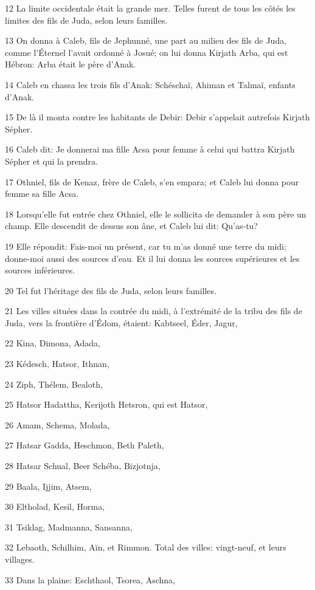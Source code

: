 \par 12 La limite occidentale était la grande mer. Telles furent de tous les côtés les limites des fils de Juda, selon leurs familles.
\par 13 On donna à Caleb, fils de Jephunné, une part au milieu des fils de Juda, comme l'Éternel l'avait ordonné à Josué; on lui donna Kirjath Arba, qui est Hébron: Arba était le père d'Anak.
\par 14 Caleb en chassa les trois fils d'Anak: Schéschaï, Ahiman et Talmaï, enfants d'Anak.
\par 15 De là il monta contre les habitants de Debir: Debir s'appelait autrefois Kirjath Sépher.
\par 16 Caleb dit: Je donnerai ma fille Acsa pour femme à celui qui battra Kirjath Sépher et qui la prendra.
\par 17 Othniel, fils de Kenaz, frère de Caleb, s'en empara; et Caleb lui donna pour femme sa fille Acsa.
\par 18 Lorsqu'elle fut entrée chez Othniel, elle le sollicita de demander à son père un champ. Elle descendit de dessus son âne, et Caleb lui dit: Qu'as-tu?
\par 19 Elle répondit: Fais-moi un présent, car tu m'as donné une terre du midi; donne-moi aussi des sources d'eau. Et il lui donna les sources supérieures et les sources inférieures.
\par 20 Tel fut l'héritage des fils de Juda, selon leurs familles.
\par 21 Les villes situées dans la contrée du midi, à l'extrémité de la tribu des fils de Juda, vers la frontière d'Édom, étaient: Kabtseel, Éder, Jagur,
\par 22 Kina, Dimona, Adada,
\par 23 Kédesch, Hatsor, Ithnan,
\par 24 Ziph, Thélem, Bealoth,
\par 25 Hatsor Hadattha, Kerijoth Hetsron, qui est Hatsor,
\par 26 Amam, Schema, Molada,
\par 27 Hatsar Gadda, Heschmon, Beth Paleth,
\par 28 Hatsar Schual, Beer Schéba, Bizjotnja,
\par 29 Baala, Ijjim, Atsem,
\par 30 Eltholad, Kesil, Horma,
\par 31 Tsiklag, Madmanna, Sansanna,
\par 32 Lebaoth, Schilhim, Aïn, et Rimmon. Total des villes: vingt-neuf, et leurs villages.
\par 33 Dans la plaine: Eschthaol, Tsorea, Aschna,

